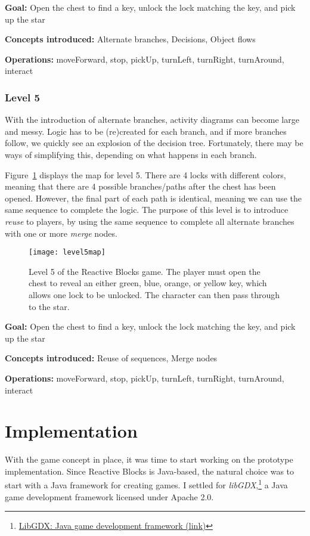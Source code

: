 \noindent
\textbf{Goal:} Open the chest to find a key, unlock the lock matching the key, and pick up the star

\noindent
\textbf{Concepts introduced:} Alternate branches, Decisions, Object flows

\noindent
\textbf{Operations:} moveForward, stop, pickUp, turnLeft, turnRight, turnAround, interact

\subsubsection{Level 5}
With the introduction of alternate branches, activity diagrams can become large and messy. Logic has to be (re)created for each branch, and if more branches follow, we quickly see an explosion of the decision tree. Fortunately, there may be ways of simplifying this, depending on what happens in each branch.

\noindent
Figure~\ref{fig:level5map} displays the map for level 5. There are 4 locks with different colors, meaning that there are 4 possible branches/paths after the chest has been opened. However, the final part of each path is identical, meaning we can use the same sequence to complete the logic. The purpose of this level is to introduce \emph{reuse} to players, by using the same sequence to complete all alternate branches with one or more \emph{merge} nodes.

\begin{figure}[htp]
	\centering
	\texttt{[image: level5map]}
	\caption[Level 5 of the Reactive Blocks game]{Level 5 of the Reactive Blocks game. The player must open the chest to reveal an either green, blue, orange, or yellow key, which allows one lock to be unlocked. The character can then pass through to the star.}
	\label{fig:level5map}
\end{figure}

\noindent
\textbf{Goal:} Open the chest to find a key, unlock the lock matching the key, and pick up the star

\noindent
\textbf{Concepts introduced:} Reuse of sequences, Merge nodes

\noindent
\textbf{Operations:} moveForward, stop, pickUp, turnLeft, turnRight, turnAround, interact

\section{Implementation}
\label{sec:game_implementation}
With the game concept in place, it was time to start working on the prototype implementation. Since Reactive Blocks is Java-based, the natural choice was to start with a Java framework for creating games. I settled for \emph{libGDX},\footnote{\href{http://libgdx.badlogicgames.com/}{LibGDX: Java game development framework (link)}} a Java game development framework licensed under Apache 2.0.

